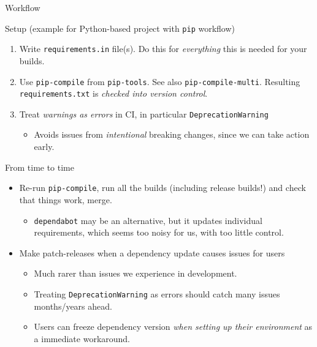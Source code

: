 \documentclass[english,aspectratio=1610,smaller]{beamer}
\begin{document}
\begin{frame}{Workflow}
  \begin{block}{Setup (example for Python-based project with \texttt{pip} workflow)}
    \begin{enumerate}
      \item Write \texttt{requirements.in} file(s).
        Do this for \emph{everything} this is needed for your builds.
      \item Use \texttt{pip-compile} from \texttt{pip-tools}. See also \texttt{pip-compile-multi}.
        Resulting \texttt{requirements.txt} is \emph{checked into version control}.
      \item Treat \emph{warnings as errors} in CI, in particular \texttt{DeprecationWarning}
        \begin{itemize}
          \item Avoids issues from \emph{intentional} breaking changes, since we can take action early.
        \end{itemize}
    \end{enumerate}
  \end{block}
  \begin{block}{From time to time}
    \begin{itemize}
      \item Re-run \texttt{pip-compile}, run all the builds (including release builds!) and check that things work, merge.
        \begin{itemize}
          \item \texttt{dependabot} may be an alternative, but it updates individual requirements, which seems too noisy for us, with too little control.
        \end{itemize}
      \item Make patch-releases when a dependency update causes issues for users
        \begin{itemize}
          \item Much rarer than issues we experience in development.
          \item Treating \texttt{DeprecationWarning} as errors should catch many issues months/years ahead.
          \item Users can freeze dependency version \emph{when setting up their environment} as a immediate workaround.
        \end{itemize}
    \end{itemize}
  \end{block}
\end{frame}
\end{document}
